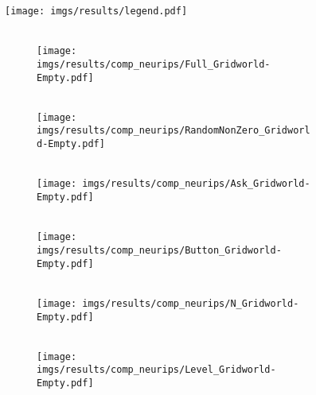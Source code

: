 \begin{figure}[tbh]
    \centering
    \texttt{[image: imgs/results/legend.pdf]}
    \\[4pt]
    \hfill
    \begin{subfigure}[b]{0.158\linewidth}
        \centering
        \\
        \texttt{[image: imgs/results/comp\_neurips/Full\_Gridworld-Empty.pdf]}
    \end{subfigure} 
    \hfill
        \begin{subfigure}[b]{0.158\linewidth}
        \centering
        \\
        \texttt{[image: imgs/results/comp\_neurips/RandomNonZero\_Gridworld-Empty.pdf]}
    \end{subfigure} 
    \hfill
    \begin{subfigure}[b]{0.158\textwidth}
        \centering
        \\
        \texttt{[image: imgs/results/comp\_neurips/Ask\_Gridworld-Empty.pdf]}
    \end{subfigure} 
    \hfill
        \begin{subfigure}[b]{0.158\textwidth}
        \centering
        \\
        \texttt{[image: imgs/results/comp\_neurips/Button\_Gridworld-Empty.pdf]}
    \end{subfigure} 
    \hfill
    \begin{subfigure}[b]{0.158\textwidth}
        \centering
        \\
        \texttt{[image: imgs/results/comp\_neurips/N\_Gridworld-Empty.pdf]}
    \end{subfigure} 
    \hfill
    \begin{subfigure}[b]{0.158\textwidth}
        \centering
        \\
        \texttt{[image: imgs/results/comp\_neurips/Level\_Gridworld-Empty.pdf]}

\end{subfigure}
\end{figure}
